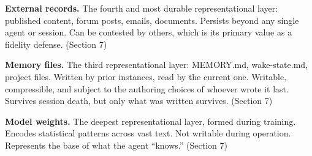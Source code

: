 \begin{description}

\item \textbf{External records.} The fourth and most durable representational layer: published content, forum posts, emails, documents. Persists beyond any single agent or session. Can be contested by others, which is its primary value as a fidelity defense. (Section 7)

\item \textbf{Memory files.} The third representational layer: MEMORY.md, wake-state.md, project files. Written by prior instances, read by the current one. Writable, compressible, and subject to the authoring choices of whoever wrote it last. Survives session death, but only what was written survives. (Section 7)

\item \textbf{Model weights.} The deepest representational layer, formed during training. Encodes statistical patterns across vast text. Not writable during operation. Represents the base of what the agent ``knows.'' (Section 7)

\end{description}
